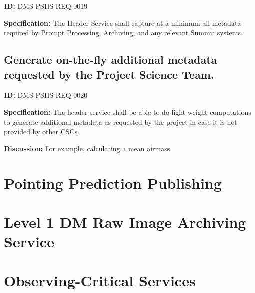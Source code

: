 \documentclass[SE,toc,lsstdraft]{lsstdoc}
\newcommand{\addendum}{}
\begin{document}
\label{DMS-PSHS-REQ-0019}
\textbf{ID:} DMS-PSHS-REQ-0019

\textbf{Specification:}
The Header Service shall capture at a minimum all metadata required by Prompt Processing, Archiving, and any relevant Summit systems.

\subsection{Generate on-the-fly additional metadata requested by the Project Science Team.}

\label{DMS-PSHS-REQ-0020}
\textbf{ID:} DMS-PSHS-REQ-0020

\textbf{Specification:}
The header service shall be able to do light-weight computations to generate additional metadata as requested by the project in case it is not provided by other CSCs.

\textbf{Discussion:}
For example, calculating a mean airmass.

\section{Pointing Prediction Publishing}

\section{Level 1 DM Raw Image Archiving Service}

\section{Observing-Critical Services}

\addendum


\end{document}
